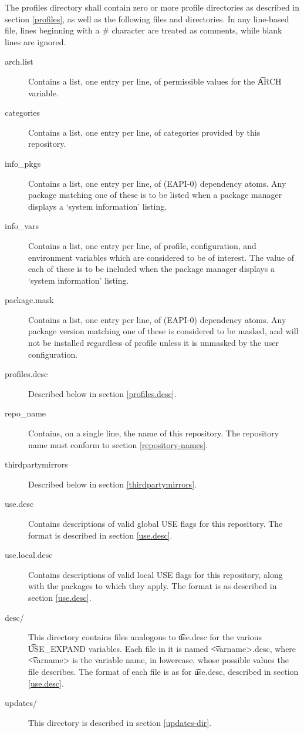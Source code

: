 The profiles directory shall contain zero or more profile directories as described in section
\ref{profiles}, as well as the following files and directories. In any line-based file, lines
beginning with a \# character are treated as comments, while blank lines are ignored.
\begin{description}
\item[arch.list] Contains a list, one entry per line, of permissible values for the \t{ARCH}
    variable.
\item[categories] Contains a list, one entry per line, of categories provided by this repository.
\item[info\_pkgs] Contains a list, one entry per line, of (EAPI-0) dependency atoms. Any package
    matching one of these is to be listed when a package manager displays a `system information'
    listing.
\item[info\_vars] Contains a list, one entry per line, of profile, configuration, and environment
    variables which are considered to be of interest. The value of each of these is to be included
    when the package manager displays a `system information' listing.
\item[package.mask] Contains a list, one entry per line, of (EAPI-0) dependency atoms. Any package
    version matching one of these is considered to be masked, and will not be installed regardless
    of profile unless it is unmasked by the user configuration.
\item[profiles.desc] Described below in section \ref{profiles.desc}.
\item[repo\_name] Contains, on a single line, the name of this repository. The repository name must
    conform to section \ref{repository-names}.
\item[thirdpartymirrors] Described below in section \ref{thirdpartymirrors}.
\item[use.desc] Contains descriptions of valid global USE flags for this repository. The format is
    described in section \ref{use.desc}.
\item[use.local.desc] Contains descriptions of valid local USE flags for this repository, along with
    the packages to which they apply. The format is as described in section \ref{use.desc}.
\item[desc/] This directory contains files analogous to \t{use.desc} for the various \t{USE\_EXPAND}
    variables. Each file in it is named \t{<varname>.desc}, where \t{<varname>} is the variable
    name, in lowercase, whose possible values the file describes. The format of each file is as for
    \t{use.desc}, described in section \ref{use.desc}.
\item[updates/] This directory is described in section \ref{updates-dir}.
\end{description}

